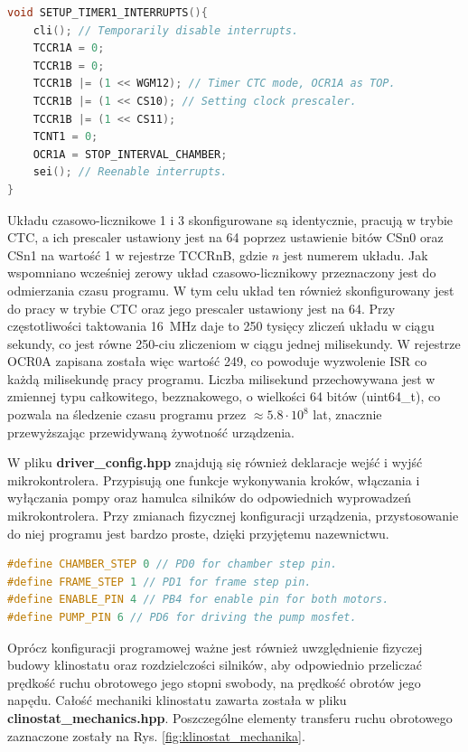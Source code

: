 \begin{lstlisting}[language=C++, caption=Przykładowa konfiguracja pierwszego układu czasowo-licznikowego.]
void SETUP_TIMER1_INTERRUPTS(){
	cli(); // Temporarily disable interrupts.
	TCCR1A = 0;
	TCCR1B = 0;
	TCCR1B |= (1 << WGM12); // Timer CTC mode, OCR1A as TOP.
	TCCR1B |= (1 << CS10); // Setting clock prescaler.
	TCCR1B |= (1 << CS11);
	TCNT1 = 0;
	OCR1A = STOP_INTERVAL_CHAMBER;
	sei(); // Reenable interrupts.
}
\end{lstlisting}
Układu czasowo-licznikowe 1 i 3 skonfigurowane są identycznie, pracują w trybie CTC, a ich prescaler ustawiony jest na 64 poprzez ustawienie bitów CSn0 oraz CSn1 na wartość 1 w rejestrze TCCRnB, gdzie $n$ jest numerem układu.  Jak wspomniano wcześniej zerowy układ czasowo-licznikowy przeznaczony jest do odmierzania czasu programu. W tym celu układ ten również skonfigurowany jest do pracy w trybie CTC oraz jego prescaler ustawiony jest na 64. Przy częstotliwości taktowania \SI{16}{MHz} daje to 250 tysięcy zliczeń układu w ciągu sekundy, co jest równe 250-ciu zliczeniom w ciągu jednej milisekundy. W rejestrze OCR0A zapisana została więc wartość 249, co powoduje wyzwolenie ISR co każdą milisekundę pracy programu. Liczba milisekund przechowywana jest w zmiennej typu całkowitego, bezznakowego, o wielkości 64 bitów (uint64\_t), co pozwala na śledzenie czasu programu przez $\approx5.8\cdot 10^8$ lat, znacznie przewyższając przewidywaną żywotność urządzenia.

W pliku \textbf{driver\_config.hpp} znajdują się również deklaracje wejść i wyjść mikrokontrolera. Przypisują one funkcje wykonywania kroków, włączania i wyłączania pompy oraz hamulca silników do odpowiednich wyprowadzeń mikrokontrolera. Przy zmianach fizycznej konfiguracji urządzenia, przystosowanie do niej programu jest bardzo proste, dzięki przyjętemu nazewnictwu.

\begin{lstlisting}[language=C++, caption=Konfiguracja wyprowadzeń.]
#define CHAMBER_STEP 0 // PD0 for chamber step pin.
#define FRAME_STEP 1 // PD1 for frame step pin.
#define ENABLE_PIN 4 // PB4 for enable pin for both motors.
#define PUMP_PIN 6 // PD6 for driving the pump mosfet.
\end{lstlisting}

Oprócz konfiguracji programowej ważne jest również uwzględnienie fizyczej budowy klinostatu oraz rozdzielczości silników, aby odpowiednio przeliczać prędkość ruchu obrotowego jego stopni swobody, na prędkość obrotów jego napędu. Całość mechaniki klinostatu zawarta została w pliku \textbf{clinostat\_mechanics.hpp}. Poszczególne elementy transferu ruchu obrotowego zaznaczone zostały na Rys. \ref{fig:klinostat_mechanika}.

